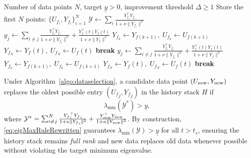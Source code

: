\documentclass[conference]{ieeeconf}
\begin{document}
\begin{algorithm}
\caption{ICL Data Selection}
\label{algo:dataselection}
\begin{algorithmic}[1]
\Require Number of data points $N$, target $\underline{y} > 0$, improvement threshold $\Delta \geq 1$
\State Store the first $N$ points: $\{U_{f_i}, Y_{f_i}\}_{i=1}^{N}$
    \State $\mathcal{Y} \gets \sum_{i} \frac{Y_{f_i}^{\top}Y_{f_i}}{1+ \nu \|Y_{f_i}\|^2}$ 
            \State $y_j \gets \sum_{i\neq j} \frac{Y_{f_i}^{\top}Y_{f_i}}{1+ \nu \|Y_{f_i}\|^2} + \frac{Y_f^{\top}(t)Y_f(t)}{{1+ \nu \|Y_{f}\|^2}}$
                    \State $Y_{f_k} \gets Y_{f(k+1)},\; U_{f_k} \gets U_{f(k+1)}$
                \EndFor
                \State $Y_{f_N} \gets Y_f(t),\; U_{f_N} \gets U_{f}(t)$
                \State \textbf{break}
            \EndIf
        \EndFor
    \Else
            \State $y_j \gets \sum_{i\neq j} \frac{Y_{f_i}^{\top}Y_{f_i}}{1+ \nu \|Y_{f_i}\|^2} + \frac{Y_f^{\top}(t)Y_f(t)}{{1+ \nu \|Y_{f}\|^2}}$
                    \State $Y_{f_k} \gets Y_{f(k+1)},\; U_{f_k} \gets U_{f(k+1)}$
                \EndFor
                \State $Y_{f_N} \gets Y_f(t),\; U_{f_N} \gets U_{f}(t)$
                \State \textbf{break}
            \EndIf
        \EndFor
    \EndIf
\EndFor
\end{algorithmic}
\end{algorithm}

Under Algorithm~\ref{algo:dataselection}, a candidate data point $(U_{\rm new}, Y_{\rm new})$ replaces the oldest possible entry $({U_f}_{j}, {Y_f}_{j})$ in the history stack $H$ if
\begin{equation}\label{eq:eigMaxRuleRewritten}
\lambda_{\min}(\mathcal{Y}^{\ast}) > \underline{y},
\end{equation}
where $\mathcal{Y}^{\ast} = \sum_{i\neq j}^{N} \frac{{Y_f}_i^\top {Y_f}_i}{1 + \kappa \|{Y_f}_i\|^2} + \frac{Y_{\rm new}^\top Y_{\rm new}}{1 + \kappa \|Y_{\rm new}\|^2}$. By construction, \eqref{eq:eigMaxRuleRewritten} guarantees $\lambda_{\min}(\mathcal{Y}) > \underline{y}$ for all $t > t_{s}$, ensuring the history stack remains \emph{full rank} and new data replaces old data whenever possible without violating the target minimum eigenvalue.
\end{document}
